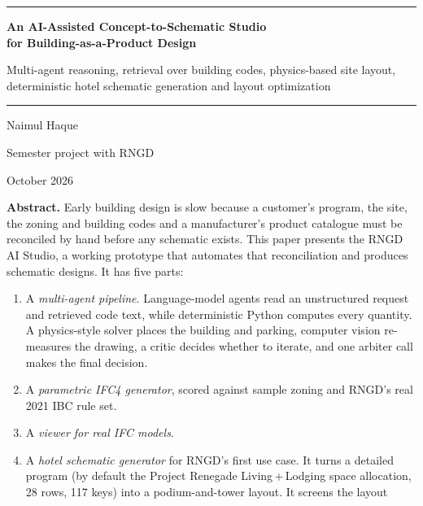\documentclass[10pt,a4paper]{article}
\theoremstyle{definition}
\begin{document}
\begin{titlepage}
\centering
\vspace*{0.1cm}
{\color{bpdeep}\rule{\linewidth}{1.2pt}}\par\vspace{0.6cm}
{\huge\bfseries\color{bpdeep} An AI-Assisted Concept-to-Schematic Studio\\[0.3em] for Building-as-a-Product Design}\par
\vspace{0.5cm}
{\large Multi-agent reasoning, retrieval over building codes, physics-based site layout,\\
deterministic hotel schematic generation and layout optimization}\par
\vspace{0.4cm}
{\color{bpdeep}\rule{\linewidth}{1.2pt}}\par
\vspace{0.5cm}
{\large Naimul Haque}\par
{\normalsize Semester project with RNGD}\par
\vspace{0.4cm}
{\normalsize October 2026}\par
\vspace{0.5cm}
\begin{minipage}{0.86\linewidth}
\small
\textbf{Abstract.}
Early building design is slow because a customer's program, the site, the zoning and building codes and a
manufacturer's product catalogue must be reconciled by hand before any schematic exists. This paper presents the
RNGD AI Studio, a working prototype that automates that reconciliation and produces schematic designs.
It has five parts:
\begin{enumerate}
\item A \emph{multi-agent pipeline}. Language-model agents read an unstructured request and retrieved code text, while
deterministic Python computes every quantity. A physics-style solver places the building and parking, computer vision
re-measures the drawing, a critic decides whether to iterate, and one arbiter call makes the final decision.
\item A \emph{parametric IFC4 generator}, scored against sample zoning and RNGD's real 2021 IBC rule set.
\item A \emph{viewer for real IFC models}.
\item A \emph{hotel schematic generator} for RNGD's first use case. It turns a detailed program (by default the Project
Renegade Living\,+\,Lodging space allocation, 28 rows, 117 keys) into a podium-and-tower layout. It screens the layout

\end{enumerate}
\end{minipage}
\end{titlepage}
\end{document}
